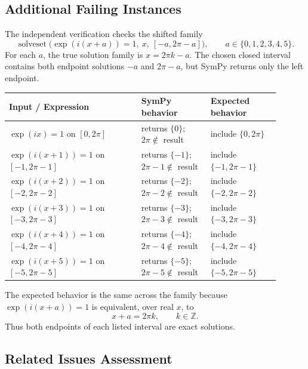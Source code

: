 \documentclass[11pt]{article}
\begin{document}
\subsection{Additional Failing Instances}

The independent verification checks the shifted family
\[
    \operatorname{solveset}\bigl(\exp(i(x+a))=1,\ x,\ [-a,2\pi-a]\bigr),
    \qquad a\in\{0,1,2,3,4,5\}.
\]
For each \(a\), the true solution family is \(x=2\pi k-a\).  The chosen closed
interval contains both endpoint solutions \(-a\) and \(2\pi-a\), but SymPy
returns only the left endpoint.

\begin{center}
\small
\renewcommand{\arraystretch}{1.3}
\begin{tabular}{@{}>{\raggedright\arraybackslash}p{0.44\linewidth}>{\raggedright\arraybackslash}p{0.23\linewidth}>{\raggedright\arraybackslash}p{0.23\linewidth}@{}}
\toprule
\textbf{Input / Expression} & \textbf{SymPy behavior} & \textbf{Expected behavior} \\
\midrule
\(\exp(i x)=1\) on \([0,2\pi]\) & returns \(\{0\}\); \(2\pi\notin\) result & include \(\{0,2\pi\}\) \\
\(\exp(i(x+1))=1\) on \([-1,2\pi-1]\) & returns \(\{-1\}\); \(2\pi-1\notin\) result & include \(\{-1,2\pi-1\}\) \\
\(\exp(i(x+2))=1\) on \([-2,2\pi-2]\) & returns \(\{-2\}\); \(2\pi-2\notin\) result & include \(\{-2,2\pi-2\}\) \\
\(\exp(i(x+3))=1\) on \([-3,2\pi-3]\) & returns \(\{-3\}\); \(2\pi-3\notin\) result & include \(\{-3,2\pi-3\}\) \\
\(\exp(i(x+4))=1\) on \([-4,2\pi-4]\) & returns \(\{-4\}\); \(2\pi-4\notin\) result & include \(\{-4,2\pi-4\}\) \\
\(\exp(i(x+5))=1\) on \([-5,2\pi-5]\) & returns \(\{-5\}\); \(2\pi-5\notin\) result & include \(\{-5,2\pi-5\}\) \\
\bottomrule
\end{tabular}
\end{center}

The expected behavior is the same across the family because
\(\exp(i(x+a))=1\) is equivalent, over real \(x\), to
\[
    x+a=2\pi k,\qquad k\in\mathbb{Z}.
\]
Thus both endpoints of each listed interval are exact solutions.

\subsection{Related Issues Assessment}
\end{document}
